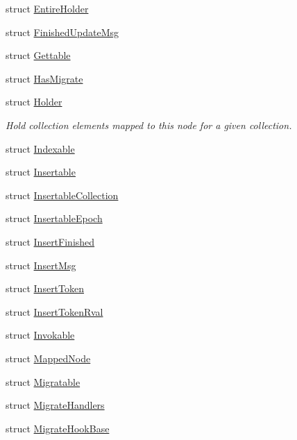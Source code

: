 \begin{DoxyCompactItemize}
\item 
struct \hyperlink{structvt_1_1vrt_1_1collection_1_1_entire_holder}{Entire\+Holder}
\item 
struct \hyperlink{structvt_1_1vrt_1_1collection_1_1_finished_update_msg}{Finished\+Update\+Msg}
\item 
struct \hyperlink{structvt_1_1vrt_1_1collection_1_1_gettable}{Gettable}
\item 
struct \hyperlink{structvt_1_1vrt_1_1collection_1_1_has_migrate}{Has\+Migrate}
\item 
struct \hyperlink{structvt_1_1vrt_1_1collection_1_1_holder}{Holder}
\begin{DoxyCompactList}\small\item\em Hold collection elements mapped to this node for a given collection. \end{DoxyCompactList}\item 
struct \hyperlink{structvt_1_1vrt_1_1collection_1_1_indexable}{Indexable}
\item 
struct \hyperlink{structvt_1_1vrt_1_1collection_1_1_insertable}{Insertable}
\item 
struct \hyperlink{structvt_1_1vrt_1_1collection_1_1_insertable_collection}{Insertable\+Collection}
\item 
struct \hyperlink{structvt_1_1vrt_1_1collection_1_1_insertable_epoch}{Insertable\+Epoch}
\item 
struct \hyperlink{structvt_1_1vrt_1_1collection_1_1_insert_finished}{Insert\+Finished}
\item 
struct \hyperlink{structvt_1_1vrt_1_1collection_1_1_insert_msg}{Insert\+Msg}
\item 
struct \hyperlink{structvt_1_1vrt_1_1collection_1_1_insert_token}{Insert\+Token}
\item 
struct \hyperlink{structvt_1_1vrt_1_1collection_1_1_insert_token_rval}{Insert\+Token\+Rval}
\item 
struct \hyperlink{structvt_1_1vrt_1_1collection_1_1_invokable}{Invokable}
\item 
struct \hyperlink{structvt_1_1vrt_1_1collection_1_1_mapped_node}{Mapped\+Node}
\item 
struct \hyperlink{structvt_1_1vrt_1_1collection_1_1_migratable}{Migratable}
\item 
struct \hyperlink{structvt_1_1vrt_1_1collection_1_1_migrate_handlers}{Migrate\+Handlers}
\item 
struct \hyperlink{structvt_1_1vrt_1_1collection_1_1_migrate_hook_base}{Migrate\+Hook\+Base}
\item 

\end{DoxyCompactItemize}
